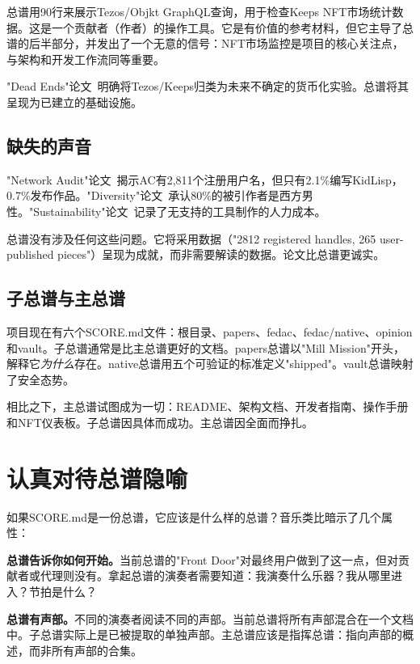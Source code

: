 \documentclass[10pt,letterpaper,twocolumn]{article}
\begin{document}
总谱用90行来展示Tezos/Objkt GraphQL查询，用于检查Keeps NFT市场统计数据。这是一个贡献者（作者）的操作工具。它是有价值的参考材料，但它主导了总谱的后半部分，并发出了一个无意的信号：NFT市场监控是项目的核心关注点，与架构和开发工作流同等重要。

"Dead Ends"论文~\citep{scudder2026deadends}明确将Tezos/Keeps归类为未来不确定的货币化实验。总谱将其呈现为已建立的基础设施。

\subsection{缺失的声音}

"Network Audit"论文~\citep{scudder2026audit}揭示AC有2,811个注册用户名，但只有2.1\%编写KidLisp，0.7\%发布作品。"Diversity"论文~\citep{scudder2026diversity}承认80\%的被引作者是西方男性。"Sustainability"论文~\citep{scudder2026sustainability}记录了无支持的工具制作的人力成本。

总谱没有涉及任何这些问题。它将采用数据（"2812 registered handles, 265 user-published pieces"）呈现为成就，而非需要解读的数据。论文比总谱更诚实。

\subsection{子总谱与主总谱}

项目现在有六个SCORE.md文件：根目录、papers、fedac、fedac/native、opinion和vault。子总谱通常是比主总谱更好的文档。papers总谱以"Mill Mission"开头，解释它\emph{为什么}存在。native总谱用五个可验证的标准定义"shipped"。vault总谱映射了安全态势。

相比之下，主总谱试图成为一切：README、架构文档、开发者指南、操作手册和NFT仪表板。子总谱因具体而成功。主总谱因全面而挣扎。

\section{认真对待总谱隐喻}

如果SCORE.md是一份总谱，它应该是什么样的总谱？音乐类比暗示了几个属性：

\textbf{总谱告诉你如何开始。}当前总谱的"Front Door"对最终用户做到了这一点，但对贡献者或代理则没有。拿起总谱的演奏者需要知道：我演奏什么乐器？我从哪里进入？节拍是什么？

\textbf{总谱有声部。}不同的演奏者阅读不同的声部。当前总谱将所有声部混合在一个文档中。子总谱实际上是已被提取的单独声部。主总谱应该是指挥总谱：指向声部的概述，而非所有声部的合集。
\end{document}
